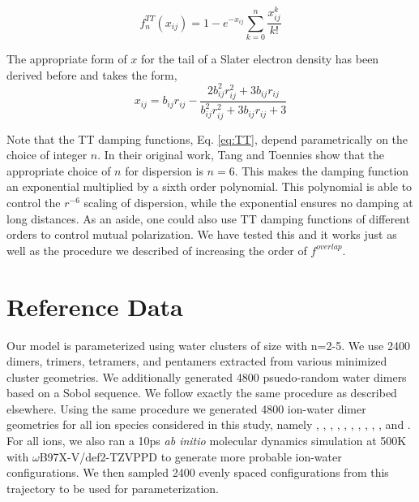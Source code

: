 \documentclass[journal=jacsat,manuscript=article]{achemso}
\begin{document}
\begin{equation}
  f_n^{TT}(x_{ij}) = 1-e^{-x_{ij}}\sum_{k=0}^n\frac{x_{ij}^k}{k!}
  \label{eq:TT}
\end{equation}

The appropriate form of $x$ for the tail of a Slater electron density
has been derived before\cite{van2016beyond} and takes the form,
\begin{equation}
  x_{ij}=b_{ij}r_{ij}-\frac{2b_{ij}^2r_{ij}^2+3b_{ij}r_{ij}}{b_{ij}^2r_{ij}^2+3b_{ij}r_{ij}+3}
  \label{eq:TT_x}
\end{equation}

Note that the TT damping functions, Eq. \ref{eq:TT}, depend parametrically on
the choice of integer $n$. In their original work, Tang and Toennies show that the appropriate choice
of $n$ for dispersion is $n=6$. This makes the damping function an exponential multiplied by a sixth order polynomial.
This polynomial is able to control the $r^{-6}$ scaling of dispersion, while the exponential ensures no
damping at long distances. As an aside, one could also use TT damping functions of different orders to control
mutual polarization. We have tested this and it works just as well as the procedure we
described of increasing the order of $f^{overlap}$.

\section*{Reference Data}

Our model is parameterized using water clusters of size  with n=2-5.
We use 2400 dimers, trimers, tetramers, and pentamers extracted from various minimized
cluster geometries. We additionally generated 4800 psuedo-random water dimers
based on a Sobol sequence. We follow exactly the same procedure as described elsewhere.\cite{misquitta2008first}
Using the same procedure we generated 4800 ion-water dimer geometries for all ion species considered in this study,
namely , , , , , , , , , , and .
For all ions, we also ran a 10ps \textit{ab initio} molecular dynamics simulation
at 500K with $\omega$B97X-V/def2-TZVPPD to generate more probable ion-water configurations. We then sampled 2400 evenly spaced
configurations from this trajectory to be used for parameterization.
\end{document}
